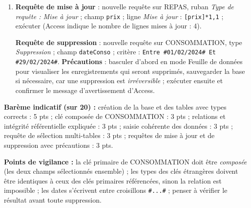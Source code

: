 \documentclass[11pt]{article}
\begin{document}
\begin{corrige}
\begin{enumerate}
  \begin{itemize}
    \item champs affichés : \texttt{nom} (ELEVE), \texttt{classe} (ELEVE) ;
    \item champs de critère non affichés : \texttt{prix} (REPAS) avec critère \texttt{> 300}, et un champ calculé ou le champ \texttt{classe} avec critère \texttt{Comme "Première*"} (ou \texttt{= "Première TI"} selon les valeurs saisies).
  \end{itemize}
  Exécuter : seuls les élèves de Première ayant consommé un repas à plus de 300 FCFA apparaissent.
  \item \textbf{Requête de mise à jour} : nouvelle requête sur REPAS, ruban \emph{Type de requête : Mise à jour} ; champ \texttt{prix} ; ligne \emph{Mise à jour} : \texttt{[prix]*1,1} ; exécuter (Access indique le nombre de lignes mises à jour : 4).
  
  \textbf{Requête de suppression} : nouvelle requête sur CONSOMMATION, type \emph{Suppression} ; champ \texttt{dateConso} ; critère : \texttt{Entre \#01/02/2024\# Et \#29/02/2024\#}. \textbf{Précautions} : basculer d'abord en mode Feuille de données pour visualiser les enregistrements qui seront supprimés, sauvegarder la base si nécessaire, car une suppression est \emph{irréversible} ; exécuter ensuite et confirmer le message d'avertissement d'Access.
\end{enumerate}

\textbf{Barème indicatif (sur 20) :} création de la base et des tables avec types corrects : 5 pts ; clé composée de CONSOMMATION : 3 pts ; relations et intégrité référentielle expliquée : 3 pts ; saisie cohérente des données : 3 pts ; requête de sélection multi-tables : 3 pts ; requêtes de mise à jour et de suppression avec précautions : 3 pts.

\textbf{Points de vigilance :} la clé primaire de CONSOMMATION doit être \emph{composée} (les deux champs sélectionnés ensemble) ; les types des clés étrangères doivent être identiques à ceux des clés primaires référencées, sinon la relation est impossible ; les dates s'écrivent entre croisillons \texttt{\#...\#} ; penser à vérifier le résultat avant toute suppression.
\end{corrige}
\end{document}
